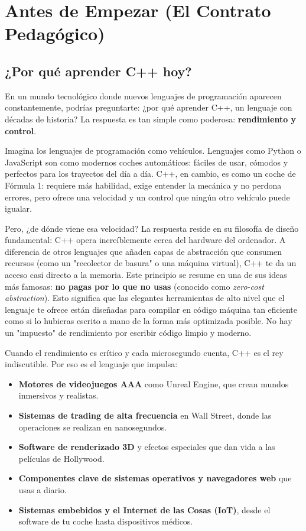 \chapter{Antes de Empezar (El Contrato Pedagógico)}
\label{chap:introduccion}


\section{¿Por qué aprender C++ hoy?}
\label{sec:motivacion}

En un mundo tecnológico donde nuevos lenguajes de programación aparecen constantemente, podrías preguntarte: ¿por qué aprender C++, un lenguaje con décadas de historia? La respuesta es tan simple como poderosa: \textbf{rendimiento y control}.

Imagina los lenguajes de programación como vehículos. Lenguajes como Python o JavaScript son como modernos coches automáticos: fáciles de usar, cómodos y perfectos para los trayectos del día a día. C++, en cambio, es como un coche de Fórmula 1: requiere más habilidad, exige entender la mecánica y no perdona errores, pero ofrece una velocidad y un control que ningún otro vehículo puede igualar.

Pero, ¿de dónde viene esa velocidad? La respuesta reside en su filosofía de diseño fundamental: C++ opera increíblemente cerca del hardware del ordenador. A diferencia de otros lenguajes que añaden capas de abstracción que consumen recursos (como un "recolector de basura" o una máquina virtual), C++ te da un acceso casi directo a la memoria. Este principio se resume en una de sus ideas más famosas: \textbf{no pagas por lo que no usas} (conocido como \textit{zero-cost abstraction}). Esto significa que las elegantes herramientas de alto nivel que el lenguaje te ofrece están diseñadas para compilar en código máquina tan eficiente como si lo hubieras escrito a mano de la forma más optimizada posible. No hay un "impuesto" de rendimiento por escribir código limpio y moderno.

Cuando el rendimiento es crítico y cada microsegundo cuenta, C++ es el rey indiscutible. Por eso es el lenguaje que impulsa:
\begin{itemize}
    \item \textbf{Motores de videojuegos AAA} como Unreal Engine, que crean mundos inmersivos y realistas.
    \item \textbf{Sistemas de trading de alta frecuencia} en Wall Street, donde las operaciones se realizan en nanosegundos.
    \item \textbf{Software de renderizado 3D} y efectos especiales que dan vida a las películas de Hollywood.
    \item \textbf{Componentes clave de sistemas operativos y navegadores web} que usas a diario.
    \item \textbf{Sistemas embebidos y el Internet de las Cosas (IoT)}, desde el software de tu coche hasta dispositivos médicos.
\end{itemize}

